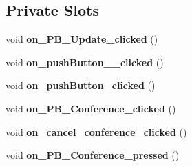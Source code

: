 \subsection*{Private Slots}
\begin{DoxyCompactItemize}
\item 
\mbox{\label{classmodify_stadium_info_a22af306c4ec113b980764cbc434121d7}} 
void {\bfseries on\+\_\+\+P\+B\+\_\+\+Update\+\_\+clicked} ()
\item 
\mbox{\label{classmodify_stadium_info_ab76af639ca542e2c067674a50da82f69}} 
void {\bfseries on\+\_\+push\+Button\+\_\+\_\+clicked} ()
\item 
\mbox{\label{classmodify_stadium_info_a80877d8967425a8654a5aa62eecf3412}} 
void {\bfseries on\+\_\+push\+Button\+\_\+clicked} ()
\item 
\mbox{\label{classmodify_stadium_info_aebbbe8574a0c7bca07a8f297412a1cdd}} 
void {\bfseries on\+\_\+\+P\+B\+\_\+\+Conference\+\_\+clicked} ()
\item 
\mbox{\label{classmodify_stadium_info_a3342812eadbf4f305cf9e2c500974c23}} 
void {\bfseries on\+\_\+cancel\+\_\+conference\+\_\+clicked} ()
\item 
\mbox{\label{classmodify_stadium_info_a30f2b386fd45a884382372c95a80c330}} 
void {\bfseries on\+\_\+\+P\+B\+\_\+\+Conference\+\_\+pressed} ()
\end{DoxyCompactItemize}
